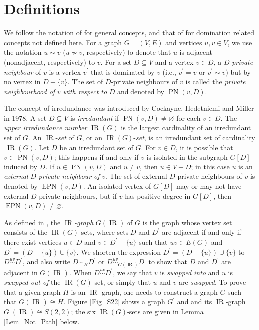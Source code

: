 \documentclass[12pt]{article}%
\begin{document}
\section{Definitions}

\label{Sec_Defs}We follow the notation of \cite{CLZ} for general concepts, and
that of \cite{HHS} for domination related concepts not defined here. For a
graph $G=(V,E)$ and vertices $u,v\in V$, we use the notation $u\sim v$
($u\nsim v$, respectively) to denote that $u$ is adjacent (nonadjacent,
respectively) to $v$. For a set $D\subseteq V$ and a vertex $v\in D$, a
$D$-\emph{private neighbour }of $v$ is a vertex $v^{\prime}$ that is dominated
by $v$ (i.e., $v^{\prime}=v$ or $v^{\prime}\sim v$) but by no vertex in
$D-\{v\}$. The set of $D$-private neighbours of $v$ is called the
\emph{private neighbourhood of }$v$ \emph{with respect to }$D$ and denoted by
$\operatorname{PN}(v,D)$.

The concept of irredundance was introduced by Cockayne, Hedetniemi and Miller
\cite{CHM} in 1978. A set $D\subseteq V$ is \emph{irredundant }if
$\operatorname{PN}(v,D)\neq\varnothing$ for each $v\in D$. The \emph{upper
irredundance number }$\operatorname{IR}(G)$ is the largest cardinality of an
irredundant set of $G$. An $\operatorname{IR}$-\emph{set} of $G$, or an
$\operatorname{IR}(G)$-\emph{set}, is an irredundant set of
cardinality$~\operatorname{IR}(G)$. Let $D$ be an irredundant set of $G$. For
$v\in D$, it is possible that $v\in\operatorname{PN}(v,D)$; this happens if
and only if $v$ is isolated in the subgraph $G[D]$ induced by $D$. If
$u\in\operatorname{PN}(v,D)$ and $u\neq v$, then $u\in V-D$; in this case $u$
is an \emph{external }$D$-\emph{private neighbour of }$v$. The set of external
$D$-private neighbours of $v$ is denoted by $\operatorname{EPN}(v,D)$. An
isolated vertex of $G[D]$ may or may not have external $D$-private neighbours,
but if $v$ has positive degree in $G[D]$, then $\operatorname{EPN}%
(v,D)\neq\varnothing$.

As defined in \cite{mynhardt19}, the \emph{$\operatorname{IR}$-graph
}$G(\operatorname{IR})$\emph{ }of \emph{$G$} is the graph whose vertex set
consists of the $\operatorname{IR}(G)$-sets, where sets $D$ and $D^{\prime}$
are adjacent if and only if there exist vertices $u\in D$ and $v\in D^{\prime
}-\{u\}$ such that $uv\in E(G)$ and $D^{\prime}=(D-\{u\})\cup\{v\}$. We
shorten the expression $D^{\prime}=(D-\{u\})\cup\{v\}$ to $D\overset{uv}{\sim
}D^{\prime}$, and also write $D\sim_{H}D^{\prime}$ or $D\overset{uv}{\sim
}_{G(\operatorname{IR})}D^{\prime}$ to show that $D$ and $D^{\prime}$ are
adjacent in $G(\operatorname{IR})$. When $D\overset{uv}{\sim}D^{\prime}$, we
say that $v$ is \emph{swapped into} and $u$ is \emph{swapped out of} the
$\operatorname{IR}(G)$-set, or simply that $u$ and $v$ are \emph{swapped}. To
prove that a given graph $H$ is an $\operatorname{IR}$-graph, one needs to
construct a graph $G$ such that $G(\operatorname{IR})\cong H$. Figure
\ref{Fig_S22} shows a graph $G^{\prime}$ and and its $\operatorname{IR}$-graph
$G^{\prime}(\operatorname{IR})\cong S(2,2)$; the six $\operatorname{IR}%
(G)$-sets are given in Lemma \ref{Lem_Not_Path} below.%
\end{document}
